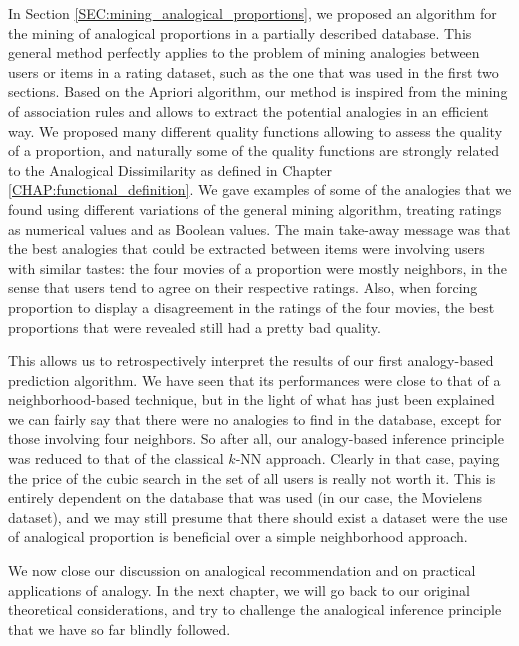 In Section \ref{SEC:mining_analogical_proportions}, we proposed an algorithm for the mining of analogical
proportions in a partially described database. This general method perfectly
applies to the problem of mining analogies between users or items in a rating
dataset, such as the one that was used in the first two sections. Based on the
Apriori algorithm, our method is inspired from the mining of association rules
and allows to extract the potential analogies in an efficient way.
We proposed many different quality functions allowing to assess the quality of
a proportion, and naturally some of the quality functions are strongly related
to the Analogical Dissimilarity as defined in Chapter
\ref{CHAP:functional_definition}. We gave
examples of some of the analogies that we found using different variations of
the general mining algorithm, treating ratings as numerical values and as
Boolean values. The main take-away message was that the best analogies that
could be extracted between items were involving users with similar tastes: the four movies of a
proportion were mostly neighbors, in the sense that users tend to agree on
their respective ratings. Also, when forcing proportion to display a
disagreement in the ratings of the four movies, the best proportions that were
revealed still had a pretty bad quality.

This allows us to retrospectively interpret the results of our first
analogy-based prediction algorithm. We have seen that its performances were close to
that of a neighborhood-based technique, but in the light of what has just been
explained we can fairly say that there were no analogies to find in the
database, except for those involving four neighbors. So after all, our
analogy-based inference principle was reduced to that of the classical $k$-NN
approach. Clearly in that case, paying the price of the cubic search in the set
of all users is really not worth it. This is entirely dependent on the database
that was used (in our case, the Movielens dataset), and we may still presume
that there should exist a dataset were the use of analogical proportion is
beneficial over a simple neighborhood approach.

We now close our discussion on analogical recommendation and on practical
applications of analogy. In the next chapter, we will go back to our original
theoretical considerations, and try to challenge the analogical inference
principle that we have so far blindly followed.
